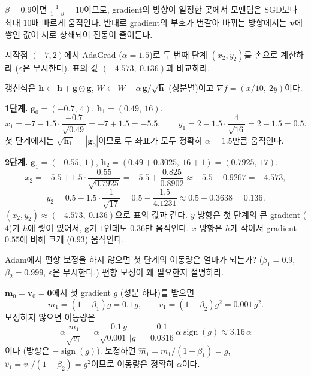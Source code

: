 \documentclass[11pt,a4paper]{article}
\begin{document}
\begin{problems}
\begin{sol}
$\beta=0.9$이면 $\frac{1}{1-\beta}=10$이므로, gradient의 방향이 일정한 곳에서 모멘텀은 SGD보다 최대 $10$배 빠르게 움직인다.
반대로 gradient의 부호가 번갈아 바뀌는 방향에서는 $\bm v$에 쌓인 값이 서로 상쇄되어 진동이 줄어든다.
\end{sol}

\item 시작점 $(-7,2)$에서 AdaGrad ($\alpha=1.5$)로 두 번째 단계 $(x_2,y_2)$를 손으로 계산하라
($\varepsilon$은 무시한다). 표의 값 $(-4.573,\ 0.136)$과 비교하라.

\begin{sol}
갱신식은 $\bm h\leftarrow\bm h+\bm g\odot\bm g$, $W\leftarrow W-\alpha\,\bm g/\sqrt{\bm h}$ (성분별)이고 $\nabla f=(x/10,\ 2y)$이다.

\textbf{1단계.} $\bm g_0=(-0.7,\ 4)$, $\bm h_1=(0.49,\ 16)$.
\[
x_1=-7-1.5\cdot\frac{-0.7}{\sqrt{0.49}}=-7+1.5=-5.5,\qquad
y_1=2-1.5\cdot\frac{4}{\sqrt{16}}=2-1.5=0.5 .
\]
첫 단계에서는 $\sqrt{\bm h_1}=|\bm g_0|$이므로 두 좌표가 모두 정확히 $\alpha=1.5$만큼 움직인다.

\textbf{2단계.} $\bm g_1=(-0.55,\ 1)$, $\bm h_2=(0.49+0.3025,\ 16+1)=(0.7925,\ 17)$.
\[
x_2=-5.5+1.5\cdot\frac{0.55}{\sqrt{0.7925}}=-5.5+\frac{0.825}{0.8902}\approx-5.5+0.9267=-4.573,
\]
\[
y_2=0.5-1.5\cdot\frac{1}{\sqrt{17}}=0.5-\frac{1.5}{4.1231}\approx0.5-0.3638=0.136 .
\]
$\boxed{(x_2,y_2)\approx(-4.573,\ 0.136)}$으로 표의 값과 같다.
$y$ 방향은 첫 단계의 큰 gradient ($4$)가 $h$에 쌓여 있어서, $\bm g$가 $1$인데도 $0.36$만 움직인다.
$x$ 방향은 $h$가 작아서 gradient $0.55$에 비해 크게 ($0.93$) 움직인다.
\end{sol}

\item Adam에서 편향 보정을 하지 않으면 첫 단계의 이동량은 얼마가 되는가?
($\beta_1=0.9$, $\beta_2=0.999$, $\varepsilon$은 무시한다.) 편향 보정이 왜 필요한지 설명하라.

\begin{sol}
$\bm m_0=\bm v_0=\bm 0$에서 첫 gradient $g$ (성분 하나)를 받으면
\[
m_1=(1-\beta_1)g=0.1\,g,\qquad v_1=(1-\beta_2)g^2=0.001\,g^2 .
\]
보정하지 않으면 이동량은
\[
\alpha\frac{m_1}{\sqrt{v_1}}=\alpha\frac{0.1\,g}{\sqrt{0.001}\,|g|}
=\frac{0.1}{0.0316}\,\alpha\operatorname{sign}(g)\approx\boxed{3.16\,\alpha}
\]
이다 (방향은 $-\operatorname{sign}(g)$).
보정하면 $\hat m_1=m_1/(1-\beta_1)=g$, $\hat v_1=v_1/(1-\beta_2)=g^2$이므로 이동량은 정확히 $\alpha$이다.


\end{sol}
\end{problems}
\end{document}
